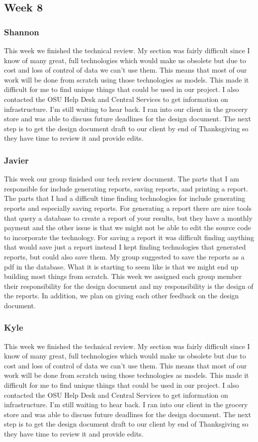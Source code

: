 \documentclass[letterpaper,10pt,serif, draftclsnofoot,onecolumn, compsoc, titlepage]{IEEEtran}
\begin{document}
\subsection{Week 8}
\subsubsection{Shannon}
This week we finished the technical review. My section was fairly difficult since I know of many great, full technologies which would make us obsolete but due to cost and loss of control of data we can't use them. This means that most of our work will be done from scratch using those technologies as models. This made it difficult for me to find unique things that could be used in our project. I also contacted the OSU Help Desk and Central Services to get information on infrastructure. I'm still waiting to hear back. I ran into our client in the grocery store and was able to discuss future deadlines for the design document. The next step is to get the design document draft to our client by end of Thanksgiving so they have time to review it and provide edits.
\subsubsection{Javier}
This week our group finished our tech review document. The parts that I am responsible for include generating reports, saving reports, and printing a report. The parts that I had a difficult time finding technologies for include generating reports and especially saving reports. For generating a report there are nice tools that query a database to create a report of your results, but they have a monthly payment and the other issue is that we might not be able to edit the source code to incorporate the technology. For saving a report it was difficult finding anything that would save just a report instead I kept finding technologies that generated reports, but could also save them. My group suggested to save the reports as a pdf in the database. What it is starting to seem like is that we might end up building most things from scratch. This week we assigned each group member their responsibility for the design document and my responsibility is the design of the reports. In addition, we plan on giving each other feedback on the design document.
\subsubsection{Kyle}
This week we finished the technical review. My section was fairly difficult since I know of many great, full technologies which would make us obsolete but due to cost and loss of control of data we can't use them. This means that most of our work will be done from scratch using those technologies as models. This made it difficult for me to find unique things that could be used in our project. I also contacted the OSU Help Desk and Central Services to get information on infrastructure. I'm still waiting to hear back. I ran into our client in the grocery store and was able to discuss future deadlines for the design document. The next step is to get the design document draft to our client by end of Thanksgiving so they have time to review it and provide edits.
\end{document}
